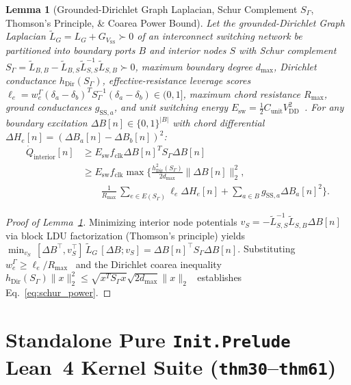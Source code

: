 \documentclass[11pt,letterpaper]{article}
\theoremstyle{spectralthm}
\newtheorem{lemma}[theorem]{Lemma}
\begin{document}
\begin{lemma}[Grounded-Dirichlet Graph Laplacian, Schur Complement $S_\Gamma$, Thomson's Principle, \& Coarea Power Bound]
\label{lem:schur_power}
Let the grounded-Dirichlet Graph Laplacian $\tilde{L}_G = L_G + G_{V_{\mathrm{SS}}} \succ 0$ of an interconnect switching network be partitioned into boundary ports $B$ and interior nodes $S$ with Schur complement $S_\Gamma = \tilde{L}_{B,B} - \tilde{L}_{B,S} \tilde{L}_{S,S}^{-1} \tilde{L}_{S,B} \succ 0$, maximum boundary degree $d_{\max}$, Dirichlet conductance $h_{\mathrm{Dir}}(S_\Gamma)$, effective-resistance leverage scores~\cite{spielman2011graph} $\ell_e = w_e^\Gamma (\delta_a - \delta_b)^T S_\Gamma^{-1}(\delta_a - \delta_b) \in (0, 1]$, maximum chord resistance $R_{\max}$, ground conductances $g_{\mathrm{SS},a}$, and unit switching energy $E_{\mathrm{sw}} = \frac{1}{2} C_{\mathrm{unit}} V_{\mathrm{DD}}^2$~\cite{1, thornton2026}. For any boundary excitation $\Delta B[n] \in \{0,1\}^{|B|}$ with chord differential $\Delta H_e[n] = (\Delta B_a[n] - \Delta B_b[n])^2$:
\begin{equation}
\label{eq:schur_power}
\begin{aligned}
\dot{Q}_{\mathrm{interior}}[n]
&\ge E_{\mathrm{sw}} f_{\mathrm{clk}} \Delta B[n]^T S_\Gamma \Delta B[n]\\
&\ge E_{\mathrm{sw}} f_{\mathrm{clk}} \max\Biggl\{ \frac{h_{\mathrm{Dir}}^2(S_\Gamma)}{2 d_{\max}} \|\Delta B[n]\|_2^2,\\
&\qquad \frac{1}{R_{\max}} \,\sum_{e\in E(S_\Gamma)} \ell_e \Delta H_e[n]
+ \sum_{a \in B} g_{\mathrm{SS},a} \Delta B_a[n]^2 \Biggr\}.
\end{aligned}
\end{equation}
\end{lemma}
\begin{proof}[Proof of Lemma~\ref{lem:schur_power}]
Minimizing interior node potentials $v_S = -\tilde{L}_{S,S}^{-1}\tilde{L}_{S,B}\Delta B[n]$ via block LDU factorization (Thomson's principle) yields $\min_{v_S}\,[\Delta B^\top, v_S^\top]\,\tilde{L}_G\,[\Delta B; v_S] = \Delta B[n]^\top S_\Gamma \Delta B[n]$. Substituting $w_e^\Gamma \ge \ell_e / R_{\max}$~\cite{spielman2011graph} and the Dirichlet coarea inequality $h_{\mathrm{Dir}}(S_\Gamma)\|x\|_2^2 \le \sqrt{x^T S_\Gamma x}\sqrt{2d_{\max}}\|x\|_2$~\cite{kamal2026cheeger} establishes Eq.~\eqref{eq:schur_power}.
\end{proof}

\onecolumn
\section{Standalone Pure \texorpdfstring{\texttt{Init.Prelude}}{Init.Prelude} Lean~4 Kernel Suite (\texorpdfstring{\texttt{thm30}--\texttt{thm61}}{thm30--thm61})}
\label{app:lean_unified}
\end{document}
